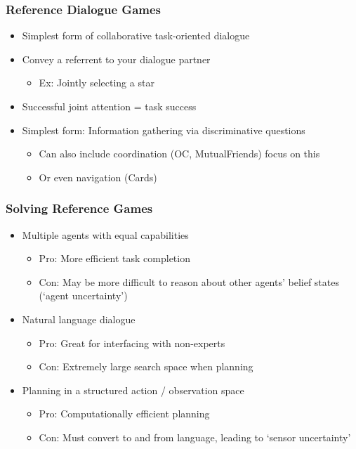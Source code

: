 \documentclass{beamer}
\begin{document}
\begin{frame}
\frametitle{Reference Dialogue Games}
\begin{itemize}
\item Simplest form of collaborative task-oriented dialogue
\item Convey a referrent to your dialogue partner
    \begin{itemize}
    \item Ex: Jointly selecting a star
    \end{itemize}
\item Successful joint attention = task success

\item Simplest form: Information gathering via discriminative questions
    \begin{itemize}
    \item Can also include coordination (OC, MutualFriends) focus on this
    \item Or even navigation (Cards)
    \end{itemize}

\end{itemize}
\end{frame}

\begin{frame}
\frametitle{Solving Reference Games}
\begin{itemize}
\item Multiple agents with equal capabilities
    \begin{itemize}
    \item Pro: More efficient task completion
    \item Con: May be more difficult to reason about other agents' belief states
        (`agent uncertainty')
    \end{itemize}
\item Natural language dialogue
    \begin{itemize}
    \item Pro: Great for interfacing with non-experts
    \item Con: Extremely large search space when planning
    \end{itemize}
\item Planning in a structured action / observation space
    \begin{itemize}
    \item Pro: Computationally efficient planning
    \item Con: Must convert to and from language, leading to `sensor uncertainty'
    \end{itemize}
\end{itemize}
\end{frame}
\end{document}

